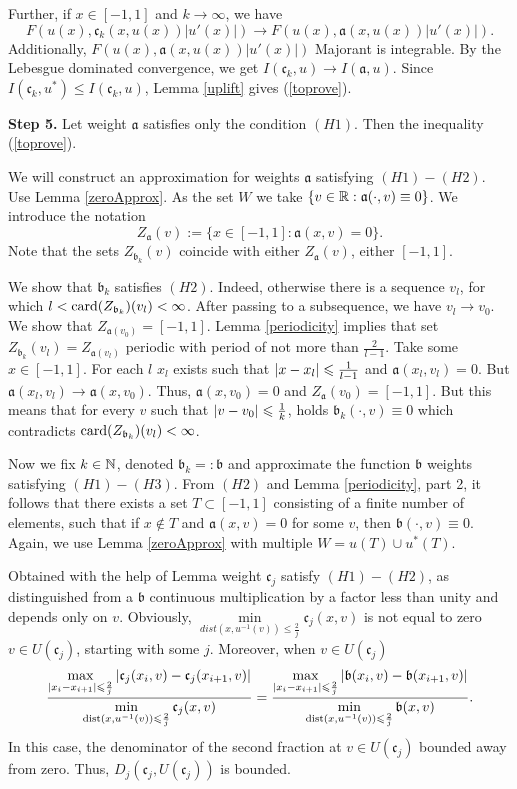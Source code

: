 Further, if $x \in [-1, 1]$ and $k \to \infty$, we have
$$F(u(x), \mathfrak c_k(x, u(x)) |u'(x)|) \to F(u(x), \mathfrak a(x, u(x)) |u'(x)|).$$
Additionally, $F(u(x), \mathfrak a(x, u(x)) |u'(x)|)$ Majorant is integrable.
By the Lebesgue dominated convergence, we get $I(\mathfrak c_k, u) \to I(\mathfrak a, u)$.
Since $I(\mathfrak c_k, u^*) \le I(\mathfrak c_k, u)$, Lemma \ref{uplift} gives (\ref{toprove}).

\bigskip
{\bf Step 5.} Let weight $\mathfrak a$ satisfies only the condition $(H1)$.
Then the inequality (\ref{toprove}).

We will construct an approximation for weights $\mathfrak a$ satisfying $(H1)-(H2)$.
Use Lemma \ref{zeroApprox}.
As the set $W$ we take $\{ v \in \mathbb R: \mathfrak a(\cdot, v) \equiv 0 \}$.
We introduce the notation $$Z_{\mathfrak a}(v) := \{ x \in [-1, 1]: \mathfrak a(x, v) = 0 \}.$$
Note that the sets $Z_{\mathfrak b_k}(v)$ coincide with either $Z_{\mathfrak a}(v)$, either $[-1, 1]$.

We show that $\mathfrak b_k$ satisfies $(H2)$.
Indeed, otherwise there is a sequence $v_l$, for which
$l < {\rm card}(Z_{\mathfrak b_k})(v_l) < \infty$.
After passing to a subsequence, we have $v_l \to v_0$.
We show that $Z_{\mathfrak a(v_0)} = [-1, 1]$. Lemma \ref{periodicity} implies that
set $Z_{\mathfrak b_k}(v_l) = Z_{\mathfrak a(v_l)}$ periodic with period of not more than $\frac{2}{l - 1}$.
Take some $x \in [-1, 1]$. For each $l$ $x_l$ exists such that
$\abs{x - x_l} \le \frac{1}{l - 1}$ and $\mathfrak a(x_l, v_l) = 0$.
But $\mathfrak a(x_l, v_l) \to \mathfrak a(x, v_0)$.
Thus, $\mathfrak a(x, v_0) = 0$ and $Z_{\mathfrak a}(v_0) = [-1, 1]$.
But this means that for every $v$ such
that $\abs{v - v_0} \le \frac{1}{k}$, holds $\mathfrak b_k(\cdot, v) \equiv 0$
which contradicts ${\rm card}(Z_{\mathfrak b_k})(v_l) < \infty$.


Now we fix $k \in \mathbb N$, denoted $\mathfrak b_k =: \mathfrak b$
and approximate the function $\mathfrak b$ weights satisfying $(H1)-(H3)$.
From $(H2)$ and Lemma \ref{periodicity}, part 2, it follows that there exists a set $T \subset [-1, 1]$
consisting of a finite number of elements, such that
if $x \not \in T$ and $\mathfrak a(x, v) = 0$ for some $v$, then $\mathfrak b(\cdot, v) \equiv 0$.
Again, we use Lemma \ref{zeroApprox} with multiple
$W = u(T) \cup u^*(T)$.

Obtained with the help of Lemma weight $\mathfrak c_j$ satisfy $(H1)-(H2)$, as distinguished from a $\mathfrak b$
continuous multiplication by a factor less than unity and depends only on $v$.
Obviously, $\min\limits_{dist(x, u^{-1}(v)) \le \frac{2}{j}} \mathfrak c_j(x, v)$ is not equal to zero
$v \in U(\mathfrak c_j)$, starting with some $j$.
Moreover, when $v \in U(\mathfrak c_j)$
$$
\frac{\max\limits_{\abs{x_i - x_{i + 1}} \le \frac{2}{j}} \abs{\mathfrak c_j(x_i, v) - \mathfrak c_j(x_{i + 1}, v)}}
{\min\limits_{\dist(x, u^{-1}(v)) \le \frac{2}{j}} \mathfrak c_j(x, v)}
=\frac{\max\limits_{\abs{x_i - x_{i + 1}} \le \frac{2}{j}} \abs{\mathfrak b(x_i, v) - \mathfrak b(x_{i + 1}, v)}}
{\min\limits_{\dist(x, u^{-1}(v)) \le \frac{2}{j}} \mathfrak b(x, v)}.
$$
In this case, the denominator of the second fraction at $v \in U(\mathfrak c_j)$ bounded away from zero.
Thus, $D_j(\mathfrak c_j, U(\mathfrak c_j))$ is bounded.

